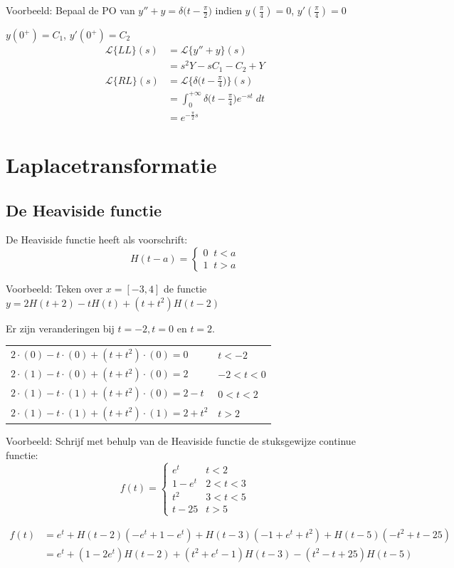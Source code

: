 \documentclass[12pt]{report}
\newcommand{\todo}[1]{
  {\color{red}\textunderscore{\textit{TODO: #1}}}
}
\newcommand{\example}[2]{
      \hrulefill
      
      Voorbeeld: #1
      
      #2
      
      \hrulefill
}
\begin{document}
\example{
  Bepaal de PO van $y'' + y = \delta\big(t - \frac{\pi}{2}\big)$ indien $y(\frac{\pi}{4}) = 0$, $y'(\frac{\pi}{4}) = 0$
}{
  $y(0^+) = C_1$, $y'(0^+) = C_2$
  \begin{equation*}
   \begin{split}
    \mathcal{L}\{LL\}(s) & = \mathcal{L}\{y'' + y\}(s) \\
			 & = s^2Y - sC_1 - C_2 + Y \\
    \mathcal{L}\{RL\}(s) & = \mathcal{L}\bigg\{\delta\big(t - \frac{\pi}{4}\bigg)\bigg\}(s) \\
                         & = \int_0^{+\infty}\delta\big(t - \frac{\pi}{4}\big)e^{-st} \; dt \\
                         & = e^{-\frac{\pi}{2}s}
   \end{split}
  \end{equation*}

}


\chapter{Laplacetransformatie}
\section{De Heaviside functie}
De Heaviside functie heeft als voorschrift:
$$H(t - a) = 
\begin{cases}
  0 \;\; t < a \\
  1 \;\; t > a
\end{cases}$$

\example{Teken over $x=[-3,4]$ de functie $y = 2H(t + 2) - tH(t) + (t+t^2)H(t-2)$}
{
Er zijn veranderingen bij $t = -2, t = 0$ en $t = 2$.

    \begin{tabular}{l | l}
    $2\cdot(0) - t\cdot(0) + (t+t^2)\cdot(0) = 0$ & $t < -2$\\
    $2\cdot(1) - t\cdot(0) + (t+t^2)\cdot(0) = 2$ & $-2 < t < 0$  \\
    $2\cdot(1) - t\cdot(1) + (t+t^2)\cdot(0) = 2 - t$ & $0 < t < 2$\\
    $2\cdot(1) - t\cdot(1) + (t+t^2)\cdot(1) = 2 + t^2$ & $t > 2$\\
    \end{tabular}
  \todo{graph}
}
\example{Schrijf met behulp van de Heaviside functie de stuksgewijze continue functie:
$$f(t) = \begin{cases}
          e^t & t < 2 \\
          1 - e^t & 2 < t < 3 \\
          t^2 & 3 < t < 5 \\
          t - 25 & t > 5
         \end{cases}
$$}{
\begin{equation*}
  \begin{split}
    f(t) & = e^t + H(t-2)(-e^t + 1 - e^t) + H(t-3)(-1 + e^t + t^2) + H(t - 5)(-t^2 + t - 25) \\
      & = e^t + (1-2e^t)H(t-2) + (t^2+e^t-1)H(t-3) - (t^2-t+25)H(t-5)
  \end{split}
\end{equation*}
}
\end{document}
